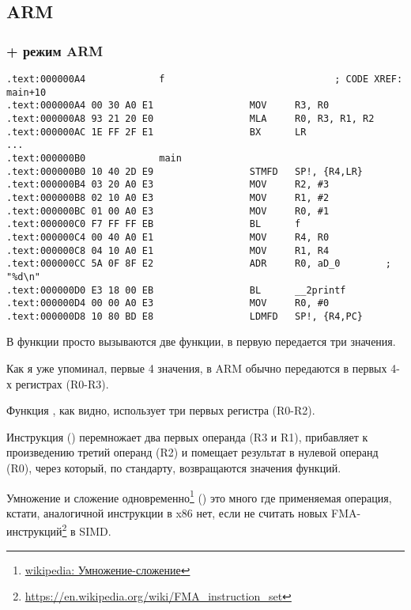 ﻿%
\subsection{ARM}

\subsubsection{\NonOptimizingKeil + режим ARM}

\begin{lstlisting}
.text:000000A4             f                              ; CODE XREF: main+10
.text:000000A4 00 30 A0 E1                 MOV     R3, R0
.text:000000A8 93 21 20 E0                 MLA     R0, R3, R1, R2
.text:000000AC 1E FF 2F E1                 BX      LR
...
.text:000000B0             main
.text:000000B0 10 40 2D E9                 STMFD   SP!, {R4,LR}
.text:000000B4 03 20 A0 E3                 MOV     R2, #3
.text:000000B8 02 10 A0 E3                 MOV     R1, #2
.text:000000BC 01 00 A0 E3                 MOV     R0, #1
.text:000000C0 F7 FF FF EB                 BL      f
.text:000000C4 00 40 A0 E1                 MOV     R4, R0
.text:000000C8 04 10 A0 E1                 MOV     R1, R4
.text:000000CC 5A 0F 8F E2                 ADR     R0, aD_0        ; "%d\n"
.text:000000D0 E3 18 00 EB                 BL      __2printf
.text:000000D4 00 00 A0 E3                 MOV     R0, #0
.text:000000D8 10 80 BD E8                 LDMFD   SP!, {R4,PC}
\end{lstlisting}

В функции \main просто вызываются две функции, в первую передается три значения.

Как я уже упоминал, первые 4 значения, в ARM обычно передаются в первых 4-х регистрах (R0-R3).

Функция , как видно, использует три первых регистра (R0-R2).

Инструкция  () перемножает два первых операнда (R3 и R1), прибавляет к произведению
третий операнд (R2) и помещает результат в нулевой операнд (R0), через который, по стандарту, возвращаются
значения функций.

Умножение и сложение одновременно\footnote{\href{https://ru.wikipedia.org/wiki/\%D0\%A3\%D0\%BC\%D0\%BD\%D0\%BE\%D0\%B6\%D0\%B5\%D0\%BD\%D0\%B8\%D0\%B5-\%D1\%81\%D0\%BB\%D0\%BE\%D0\%B6\%D0\%B5\%D0\%BD\%D0\%B8\%D0\%B5}{wikipedia: Умножение-сложение}} () это много где применяемая операция, кстати, аналогичной
инструкции в x86 нет, если не считать новых 
FMA-инструкций\footnote{\url{https://en.wikipedia.org/wiki/FMA_instruction_set}} в SIMD.

